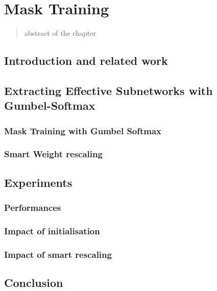 \chapter{Mask Training}

\begin{abstract}
    abstract of the chapter
\end{abstract}

\section{Introduction and related work}


\section{Extracting Effective Subnetworks with Gumbel-Softmax}


\subsection{Mask Training with Gumbel Softmax}


\subsection{Smart Weight rescaling}


\section{Experiments}

\subsection{Performances}

\subsection{Impact of initialisation}

\subsection{Impact of smart rescaling}



\section{Conclusion}

